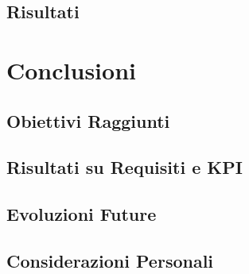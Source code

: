\documentclass[a4paper,12pt]{report}
\begin{document}
	\section{Risultati}
	
	\chapter{Conclusioni}
	
	\section{Obiettivi Raggiunti}
	
	\section{Risultati su Requisiti e KPI}
	
	\section{Evoluzioni Future}
	
	\section{Considerazioni Personali}
	
\end{document}
